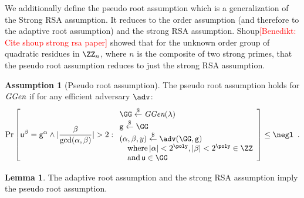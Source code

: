 \documentclass{article}
\theoremstyle{definition}
\newtheorem{lemma}{Lemma}
\newtheorem{assumption}{Assumption}
\newcommand{\benedikt}[1]{{\textcolor{red}{[Benedikt: #1]}}}
\newcommand{\benedikt}[1]{}
\begin{document}
	
We additionally define the pseudo root assumption which is a generalization of the Strong RSA assumption. It reduces to the order assumption (and therefore to the adaptive root assumption) and the strong RSA assumption. Shoup\benedikt{Cite shoup strong rsa paper} showed that for the unknown order group of quadratic residues in $\ZZ_n$, where $n$ is the composite of two strong primes, that the pseudo root assumption reduces to just the strong RSA assumption.
\begin{assumption}[Pseudo root assumption]
\label{assum:fracroot}
The pseudo root assumption holds for $\textit{GGen}$ if for any efficient adversary $\adv$:
\[        
                \Pr\left[\gr{u}^\beta = \gr{g}^{\alpha} \wedge \vert\frac{\beta}{\gcd(\alpha,\beta)}|>2   : 
                \begin{array}{l} 
                      \GG \sample \ggen(\lambda) \\ 
                      \gr{g} \sample \GG \\
                      (\alpha, \beta, y) \sample \adv(\GG, \gr{g}) \\
                      \quad \textnormal{where} \, |\alpha|<2^{\poly}, |\beta|<2^{\poly} \in \ZZ \\
                      \quad \textnormal{and} \, \gr{u} \in \GG 
                \end{array} 
        \right] \leq \negl \enspace .
\]
\end{assumption}
\begin{lemma}
	The adaptive root assumption and the strong RSA assumption imply the pseudo root assumption.
\end{lemma}
\end{document}
